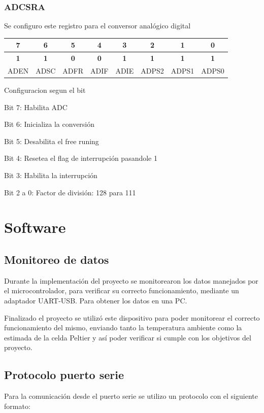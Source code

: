 \documentclass[10pt,spanish,a4paper,openany,notitlepage]{article}
\begin{document}
\subsubsection{ADCSRA}
Se configuro este registro para el conversor analógico digital
\begin{center}
\begin{tabular}{|c|c|c|c|c|c|c|c|}\hline
7&6&5&4&3&2&1&0\\\hline
\textbf{1}&\textbf{1}&\textbf{0}&\textbf{0}&\textbf{1}&\textbf{1}&\textbf{1}&\textbf{1}\\\hline
ADEN&ADSC&ADFR&ADIF&ADIE&ADPS2&ADPS1&ADPS0\\\hline
\end{tabular}
\end{center}

\begin{description}
\item{Configuracion segun el bit}
\item{Bit 7}: Habilita ADC
\item{Bit 6}: Inicializa la conversión
\item{Bit 5}: Desabilita el free runing
\item{Bit 4}: Resetea el flag de interrupción pasandole 1
\item{Bit 3}: Habilita la interrupción
\item{Bit 2 a 0}: Factor de división: 128 para 111
\end{description}

\section{Software}

\subsection{Monitoreo de datos}

Durante la implementación del proyecto se monitorearon los datos manejados
por el microcontrolador, para verificar su correcto funcionamiento, mediante
un adaptador UART-USB. Para obtener los datos en una PC.

Finalizado el proyecto se utilizó este dispositivo para poder monitorear
el correcto funcionamiento del mismo, enviando tanto la temperatura
ambiente como la estimada de la celda Peltier y así poder verificar si cumple con los objetivos del proyecto.

\subsection{Protocolo puerto serie}
Para la comunicación desde el puerto serie se utilizo un protocolo con el siguiente formato:
\end{document}
